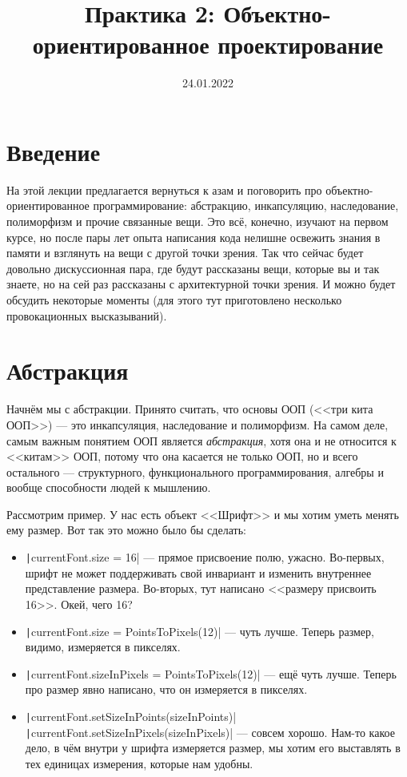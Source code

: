\documentclass[a5paper]{article}
\title{Практика 2: Объектно-ориентированное проектирование}
\date{24.01.2022}
\begin{document}
\maketitle
\thispagestyle{empty}

\section{Введение}

На этой лекции предлагается вернуться к азам и поговорить про объектно-ориентированное программирование: абстракцию, инкапсуляцию, наследование, полиморфизм и прочие связанные вещи. Это всё, конечно, изучают на первом курсе, но после пары лет опыта написания кода нелишне освежить знания в памяти и взглянуть на вещи с другой точки зрения. Так что сейчас будет довольно дискуссионная пара, где будут рассказаны вещи, которые вы и так знаете, но на сей раз рассказаны с архитектурной точки зрения. И можно будет обсудить некоторые моменты (для этого тут приготовлено несколько провокационных высказываний).

\section{Абстракция}

Начнём мы с абстракции. Принято считать, что основы ООП (<<три кита ООП>>) --- это инкапсуляция, наследование и полиморфизм. На самом деле, самым важным понятием ООП является \textit{абстракция}, хотя она и не относится к <<китам>> ООП, потому что она касается не только ООП, но и всего остального --- структурного, функционального программирования, алгебры и вообще способности людей к мышлению.

Рассмотрим пример. У нас есть объект <<Шрифт>> и мы хотим уметь менять ему размер. Вот так это можно было бы сделать:

\begin{itemize}
    \item \texttt|currentFont.size = 16| --- прямое присвоение полю, ужасно. Во-первых, шрифт не может поддерживать свой инвариант и изменить внутреннее представление размера. Во-вторых, тут написано <<размеру присвоить 16>>. Окей, чего 16?
    \item \texttt|currentFont.size = PointsToPixels(12)| --- чуть лучше. Теперь размер, видимо, измеряется в пикселях.
    \item \texttt|currentFont.sizeInPixels = PointsToPixels(12)| --- ещё чуть лучше. Теперь про размер явно написано, что он измеряется в пикселях.
    \item \texttt|currentFont.setSizeInPoints(sizeInPoints)| \newline
            \texttt|currentFont.setSizeInPixels(sizeInPixels)| --- совсем хорошо. Нам-то какое дело, в чём внутри у шрифта измеряется размер, мы хотим его выставлять в тех единицах измерения, которые нам удобны.
\end{itemize}
\end{document}
